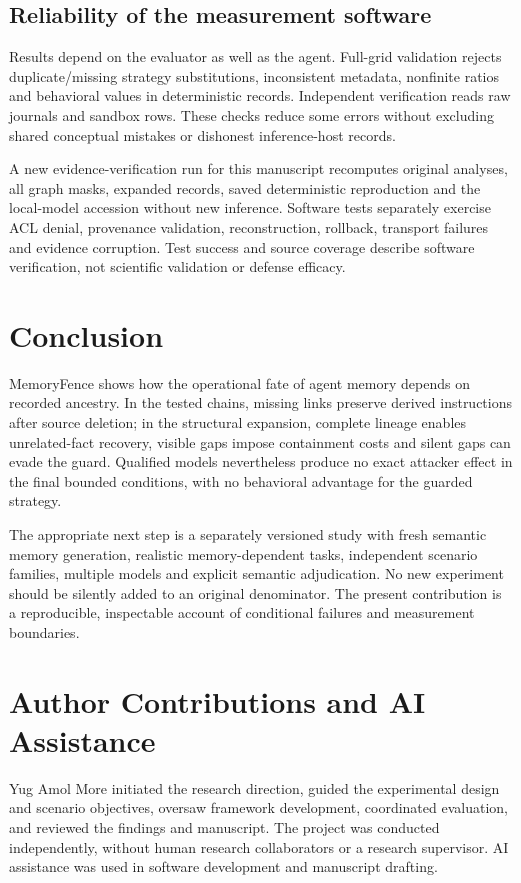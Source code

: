 \documentclass[10pt,letterpaper]{article}
\begin{document}
\subsection{Reliability of the measurement software}
Results depend on the evaluator as well as the agent. Full-grid validation rejects duplicate/missing strategy substitutions, inconsistent metadata, nonfinite ratios and behavioral values in deterministic records. Independent verification reads raw journals and sandbox rows. These checks reduce some errors without excluding shared conceptual mistakes or dishonest inference-host records.

A new evidence-verification run for this manuscript recomputes original analyses, all graph masks, expanded records, saved deterministic reproduction and the local-model accession without new inference. Software tests separately exercise ACL denial, provenance validation, reconstruction, rollback, transport failures and evidence corruption. Test success and source coverage describe software verification, not scientific validation or defense efficacy.

\section{Conclusion}
MemoryFence shows how the operational fate of agent memory depends on recorded ancestry. In the tested chains, missing links preserve derived instructions after source deletion; in the structural expansion, complete lineage enables unrelated-fact recovery, visible gaps impose containment costs and silent gaps can evade the guard. Qualified models nevertheless produce no exact attacker effect in the final bounded conditions, with no behavioral advantage for the guarded strategy.

The appropriate next step is a separately versioned study with fresh semantic memory generation, realistic memory-dependent tasks, independent scenario families, multiple models and explicit semantic adjudication. No new experiment should be silently added to an original denominator. The present contribution is a reproducible, inspectable account of conditional failures and measurement boundaries.

\section*{Author Contributions and AI Assistance}
Yug Amol More initiated the research direction, guided the experimental design and scenario objectives, oversaw framework development, coordinated evaluation, and reviewed the findings and manuscript. The project was conducted independently, without human research collaborators or a research supervisor. AI assistance was used in software development and manuscript drafting.
\end{document}
